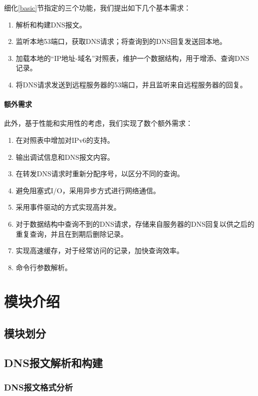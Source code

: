 \documentclass[lang=cn,11pt,a4paper,cite=authornum]{paper}
\begin{document}
细化\ref{basic}节指定的三个功能，我们提出如下几个基本需求：

\begin{enumerate}
    \item 解析和构建DNS报文。
    \item 监听本地53端口，获取DNS请求；将查询到的DNS回复发送回本地。
    \item 加载本地的“IP地址-域名”对照表，维护一个数据结构，用于增添、查询DNS记录。
    \item 将DNS请求发送到远程服务器的53端口，并且监听来自远程服务器的回复。
\end{enumerate}

\paragraph{额外需求}

此外，基于性能和实用性的考虑，我们实现了数个额外需求：

\begin{enumerate}
    \item 在对照表中增加对IPv6的支持。
    \item 输出调试信息和DNS报文内容。
    \item 在转发DNS请求时重新分配序号，以区分不同的查询。
    \item 避免阻塞式I/O，采用异步方式进行网络通信。
    \item 采用事件驱动的方式实现高并发。
    \item 对于数据结构中查询不到的DNS请求，存储来自服务器的DNS回复以供之后的重复查询，并且在到期后删除记录。
    \item 实现高速缓存，对于经常访问的记录，加快查询效率。
    \item 命令行参数解析。
\end{enumerate}

\section{模块介绍}

\subsection{模块划分}

\subsection{DNS报文解析和构建}

\subsubsection{DNS报文格式分析}
\end{document}
